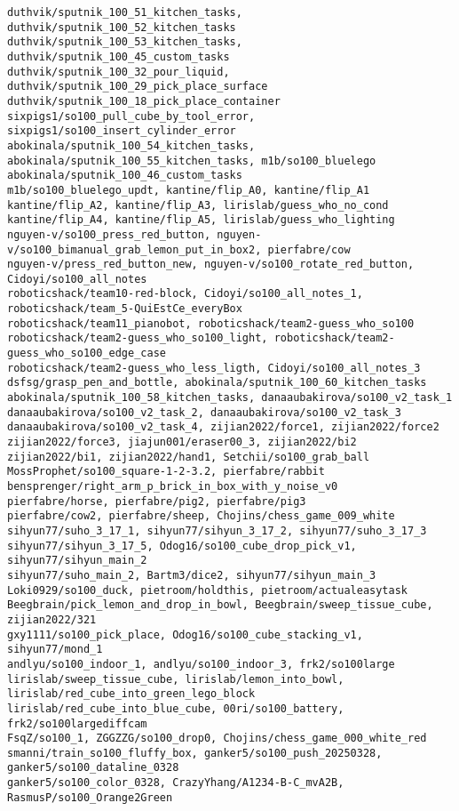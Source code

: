 \begin{verbatim}
duthvik/sputnik_100_51_kitchen_tasks, duthvik/sputnik_100_52_kitchen_tasks
duthvik/sputnik_100_53_kitchen_tasks, duthvik/sputnik_100_45_custom_tasks
duthvik/sputnik_100_32_pour_liquid, duthvik/sputnik_100_29_pick_place_surface
duthvik/sputnik_100_18_pick_place_container
sixpigs1/so100_pull_cube_by_tool_error, sixpigs1/so100_insert_cylinder_error
abokinala/sputnik_100_54_kitchen_tasks, abokinala/sputnik_100_55_kitchen_tasks, m1b/so100_bluelego
abokinala/sputnik_100_46_custom_tasks
m1b/so100_bluelego_updt, kantine/flip_A0, kantine/flip_A1
kantine/flip_A2, kantine/flip_A3, lirislab/guess_who_no_cond
kantine/flip_A4, kantine/flip_A5, lirislab/guess_who_lighting
nguyen-v/so100_press_red_button, nguyen-v/so100_bimanual_grab_lemon_put_in_box2, pierfabre/cow
nguyen-v/press_red_button_new, nguyen-v/so100_rotate_red_button, Cidoyi/so100_all_notes
roboticshack/team10-red-block, Cidoyi/so100_all_notes_1, roboticshack/team_5-QuiEstCe_everyBox
roboticshack/team11_pianobot, roboticshack/team2-guess_who_so100
roboticshack/team2-guess_who_so100_light, roboticshack/team2-guess_who_so100_edge_case
roboticshack/team2-guess_who_less_ligth, Cidoyi/so100_all_notes_3
dsfsg/grasp_pen_and_bottle, abokinala/sputnik_100_60_kitchen_tasks
abokinala/sputnik_100_58_kitchen_tasks, danaaubakirova/so100_v2_task_1
danaaubakirova/so100_v2_task_2, danaaubakirova/so100_v2_task_3
danaaubakirova/so100_v2_task_4, zijian2022/force1, zijian2022/force2
zijian2022/force3, jiajun001/eraser00_3, zijian2022/bi2
zijian2022/bi1, zijian2022/hand1, Setchii/so100_grab_ball
MossProphet/so100_square-1-2-3.2, pierfabre/rabbit
bensprenger/right_arm_p_brick_in_box_with_y_noise_v0
pierfabre/horse, pierfabre/pig2, pierfabre/pig3
pierfabre/cow2, pierfabre/sheep, Chojins/chess_game_009_white
sihyun77/suho_3_17_1, sihyun77/sihyun_3_17_2, sihyun77/suho_3_17_3
sihyun77/sihyun_3_17_5, Odog16/so100_cube_drop_pick_v1, sihyun77/sihyun_main_2
sihyun77/suho_main_2, Bartm3/dice2, sihyun77/sihyun_main_3
Loki0929/so100_duck, pietroom/holdthis, pietroom/actualeasytask
Beegbrain/pick_lemon_and_drop_in_bowl, Beegbrain/sweep_tissue_cube, zijian2022/321
gxy1111/so100_pick_place, Odog16/so100_cube_stacking_v1, sihyun77/mond_1
andlyu/so100_indoor_1, andlyu/so100_indoor_3, frk2/so100large
lirislab/sweep_tissue_cube, lirislab/lemon_into_bowl, lirislab/red_cube_into_green_lego_block
lirislab/red_cube_into_blue_cube, 00ri/so100_battery, frk2/so100largediffcam
FsqZ/so100_1, ZGGZZG/so100_drop0, Chojins/chess_game_000_white_red
smanni/train_so100_fluffy_box, ganker5/so100_push_20250328, ganker5/so100_dataline_0328
ganker5/so100_color_0328, CrazyYhang/A1234-B-C_mvA2B, RasmusP/so100_Orange2Green

\end{verbatim}
